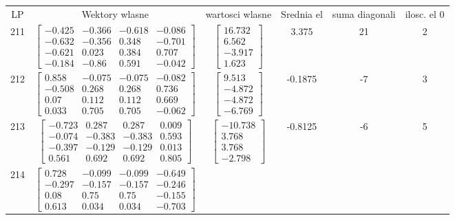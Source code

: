 \documentclass[a4paper,12pt]{article}
\begin{document}
\bgroup {} \vspace{0.2in} \begin{tabular}{c c c c c c}
LP &Wektory wlasne & wartosci wlasne & Srednia el & suma diagonali & ilosc. el 0\\
211
&
$\begin{bmatrix} -0.425 & -0.366 & -0.618 & -0.086 \\ -0.632 & -0.356 & 0.348 & -0.701 \\ -0.621 & 0.023 & 0.384 & 0.707 \\ -0.184 & -0.86 & 0.591 & -0.042 \end{bmatrix}$
&
$\begin{bmatrix} 16.732 \\ 6.562 \\ -3.917 \\ 1.623 \end{bmatrix}$
&
3.375
&
21
&
2
\\
212
&
$\begin{bmatrix} 0.858 & -0.075 & -0.075 & -0.082 \\ -0.508 & 0.268 & 0.268 & 0.736 \\ 0.07 & 0.112 & 0.112 & 0.669 \\ 0.033 & 0.705 & 0.705 & -0.062 \end{bmatrix}$
&
$\begin{bmatrix} 9.513 \\ -4.872 \\ -4.872 \\ -6.769 \end{bmatrix}$
&
-0.1875
&
-7
&
3
\\
213
&
$\begin{bmatrix} -0.723 & 0.287 & 0.287 & 0.009 \\ -0.074 & -0.383 & -0.383 & 0.593 \\ -0.397 & -0.129 & -0.129 & 0.013 \\ 0.561 & 0.692 & 0.692 & 0.805 \end{bmatrix}$
&
$\begin{bmatrix} -10.738 \\ 3.768 \\ 3.768 \\ -2.798 \end{bmatrix}$
&
-0.8125
&
-6
&
5
\\
214
&
$\begin{bmatrix} 0.728 & -0.099 & -0.099 & -0.649 \\ -0.297 & -0.157 & -0.157 & -0.246 \\ 0.08 & 0.75 & 0.75 & -0.155 \\ 0.613 & 0.034 & 0.034 & -0.703 \end{bmatrix}$

\end{tabular}
\end{document}
